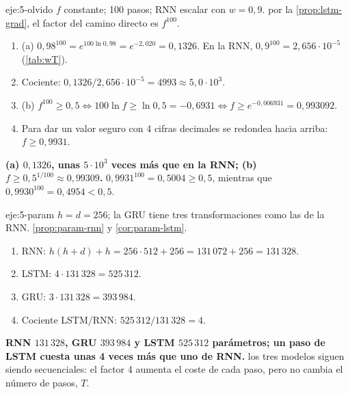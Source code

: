 \begin{solucion}{eje:5-olvido}
\datos $f$ constante; 100 pasos; RNN escalar con $w=0{,}9$.
\planteamiento por la \cref{prop:lstm-grad}, el factor del camino directo es $f^{100}$.
\pasos
\begin{enumerate}[label=\arabic*.]
  \item (a) $0{,}98^{100}=e^{100\ln 0{,}98}=e^{-2{,}020}=0{,}1326$. En la RNN, $0{,}9^{100}=2{,}656\cdot 10^{-5}$ (\cref{tab:wT}).
  \item Cociente: $0{,}1326/2{,}656\cdot 10^{-5}=4993\approx 5{,}0\cdot 10^{3}$.
  \item (b) $f^{100}\ge 0{,}5\iff 100\ln f\ge\ln 0{,}5=-0{,}6931\iff f\ge e^{-0{,}006931}=0{,}993092$.
  \item Para dar un valor seguro con 4 cifras decimales se redondea hacia arriba: $f\ge 0{,}9931$.
\end{enumerate}
\resultado \textbf{(a) $0{,}1326$, unas $5\cdot 10^{3}$ veces más que en la RNN; (b) $f\ge 0{,}5^{1/100}\approx 0{,}99309$.}
\comprobacion $0{,}9931^{100}=0{,}5004\ge 0{,}5$, mientras que $0{,}9930^{100}=0{,}4954<0{,}5$.
\end{solucion}

\begin{solucion}{eje:5-param}
\datos $h=d=256$; la GRU tiene tres transformaciones como las de la RNN.
\planteamiento \cref{prop:param-rnn} y \cref{cor:param-lstm}.
\pasos
\begin{enumerate}[label=\arabic*.]
  \item RNN: $h(h+d)+h=256\cdot 512+256=131\,072+256=131\,328$.
  \item LSTM: $4\cdot 131\,328=525\,312$.
  \item GRU: $3\cdot 131\,328=393\,984$.
  \item Cociente LSTM/RNN: $525\,312/131\,328=4$.
\end{enumerate}
\resultado \textbf{RNN $131\,328$, GRU $393\,984$ y LSTM $525\,312$ parámetros; un paso de LSTM cuesta unas 4 veces más que uno de RNN.}
\comprobacion los tres modelos siguen siendo secuenciales: el factor 4 aumenta el coste de cada paso, pero no cambia el número de pasos, $T$.
\end{solucion}

